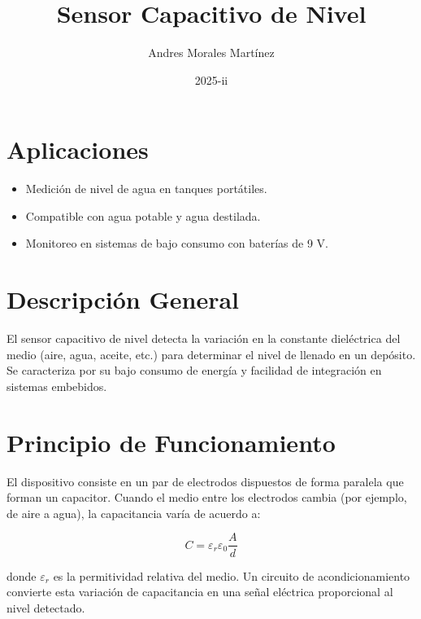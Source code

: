 \documentclass[10pt]{datasheet}
\title{Sensor Capacitivo de Nivel}
\author{Andres Morales Martínez}
\date{2025-ii}
\begin{document}
\maketitle

\section{Aplicaciones}
\begin{itemize}
    \item Medición de nivel de agua en tanques portátiles.
    \item Compatible con agua potable y agua destilada.
    \item Monitoreo en sistemas de bajo consumo con baterías de 9 V.
\end{itemize}

\section{Descripción General}
El sensor capacitivo de nivel detecta la variación en la constante dieléctrica 
del medio (aire, agua, aceite, etc.) para determinar el nivel de llenado en un depósito.  
Se caracteriza por su bajo consumo de energía y facilidad de integración en sistemas embebidos.  

\section{Principio de Funcionamiento}
El dispositivo consiste en un par de electrodos dispuestos de forma paralela que forman un capacitor.  
Cuando el medio entre los electrodos cambia (por ejemplo, de aire a agua), la capacitancia varía de acuerdo a:  

\[
C = \varepsilon_r \varepsilon_0 \frac{A}{d}
\]

donde $\varepsilon_r$ es la permitividad relativa del medio.  
Un circuito de acondicionamiento convierte esta variación de capacitancia en una señal eléctrica proporcional al nivel detectado.  

\onecolumn
\end{document}
